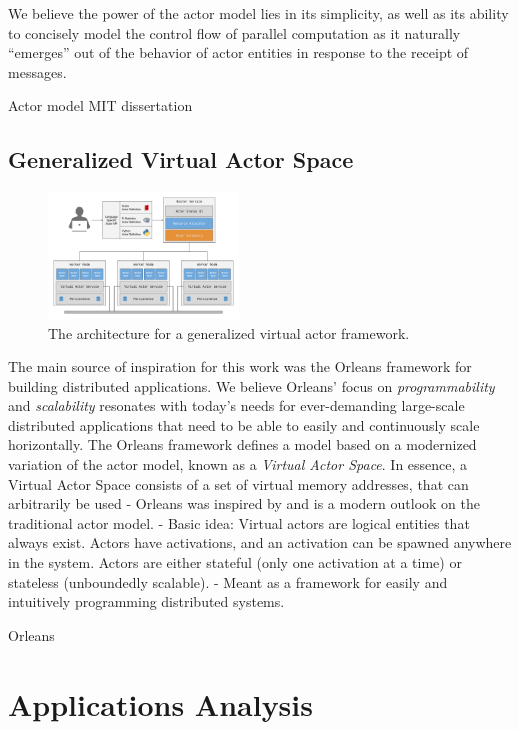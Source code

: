 \documentclass[conference,twocolumn,10pt]{IEEEtran}
\begin{document}
We believe the power of the actor model lies in its simplicity, as well as its ability to concisely model the control flow of parallel computation as it naturally ``emerges'' out of the behavior of actor entities in response to the receipt of messages.

Actor model MIT dissertation \cite{hewitt_viewing_1977, agha_actors:_1985}


\subsection{Generalized Virtual Actor Space}

\begin{figure}[!t]
    \centering
    \includegraphics[width=0.45\textwidth]{architecture}
    \caption{The architecture for a generalized virtual actor framework.}
    \label{fig:architecture}
\end{figure}

The main source of inspiration for this work was the Orleans framework for building distributed applications. We believe Orleans' focus on \textit{programmability} and \textit{scalability} resonates with today's needs for ever-demanding large-scale distributed applications that need to be able to easily and continuously scale horizontally. The Orleans  framework defines a model based on a modernized variation of the actor model, known as a \textit{Virtual Actor Space}. In essence, a Virtual Actor Space consists of a set of virtual memory addresses, that can arbitrarily be used
- Orleans was inspired by and is a modern outlook on the traditional actor model.
- Basic idea: Virtual actors are logical entities that always exist. Actors have activations, and an activation can be spawned anywhere in the system. Actors are either stateful (only one activation at a time) or stateless (unboundedly scalable).
- Meant as a framework for easily and  intuitively programming distributed systems.

Orleans \cite{bernstein_orleans:_????}



\section{Applications Analysis}
\end{document}
